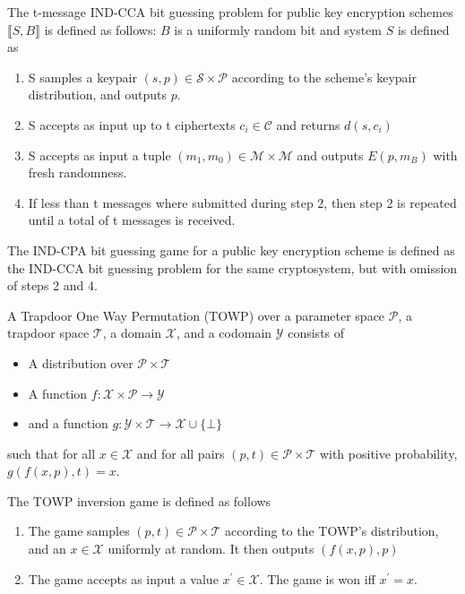 \documentclass[a4paper,german]{article}
\newenvironment{customdef}[1]{\renewcommand\theinnercustomdef{#1}\innercustomdef}{\endinnercustomdef}
\begin{document}
\begin{customdef}{3.12}
	The t-message IND-CCA bit guessing problem for public key encryption schemes $\llbracket S, B\rrbracket$ is defined as follows: $B$ is a uniformly random bit and system $S$ is defined as

	\begin{enumerate}

		\item  S samples a keypair $(s, p) \in \mathcal{S \times P}$ according to the scheme's keypair distribution, and outputs $p$.
		\item  S accepts as input up to t ciphertexts $c_i \in \mathcal{C}$ and returns $d(s, c_i)$
		\item  S accepts as input a tuple $(m_1, m_0) \in \mathcal{M \times M}$ and outputs $E(p, m_B)$ with fresh randomness.
		\item  If less than t messages where submitted during step 2, then step 2 is repeated until a total of t messages is received.

	\end{enumerate}
\end{customdef}

\begin{customdef}{3.13}
	The IND-CPA bit guessing game for a public key encryption scheme is defined as the IND-CCA bit guessing problem for the same cryptosystem, but with omission of steps 2 and 4.
\end{customdef}

\begin{customdef}{3.14}
	A Trapdoor One Way Permutation (TOWP) over a parameter space $\mathcal{P}$, a trapdoor space $\mathcal{T}$, a domain $\mathcal{X}$, and a codomain $\mathcal{Y}$ consists of

	\begin{itemize}

		\item  A distribution over $\mathcal{P \times T}$
		\item  A function $f: \mathcal{X \times P} \rightarrow \mathcal{Y}$
		\item  and a function $g: \mathcal{Y \times T} \rightarrow \mathcal{X} \cup \{\bot\}$
	\end{itemize}
	such that for all $x \in \mathcal{X}$ and for all pairs $(p, t) \in \mathcal{P \times T}$ with positive probability, $g(f(x, p), t) = x$.
\end{customdef}

\begin{customdef}{3.15}
	The TOWP inversion game is defined as follows

	\begin{enumerate}

		\item  The game samples $(p, t) \in \mathcal{P \times T}$ according to the TOWP's distribution, and an $x \in \mathcal{X}$ uniformly at random. It then outputs $(f(x, p), p)$
		\item  The game accepts as input a value $x^\prime \in \mathcal{X}$. The game is won iff $x^\prime = x$.

	\end{enumerate}
\end{customdef}
\end{document}
